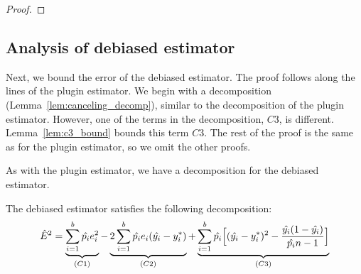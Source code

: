 \begin{proof}




\end{proof}

\subsection{Analysis of debiased estimator}

Next, we bound the error of the debiased estimator. The proof follows along the lines of the plugin estimator. We begin with a decomposition (Lemma~\ref{lem:canceling_decomp}), similar to the decomposition of the plugin estimator. However, one of the terms in the decomposition, $C3$, is different. Lemma~\ref{lem:c3_bound} bounds this term $C3$. The rest of the proof is the same as for the plugin estimator, so we omit the other proofs.

As with the plugin estimator, we have a decomposition for the debiased estimator.

\begin{lemma}
\label{lem:canceling_decomp}
The debiased estimator satisfies the following decomposition:
\[ \hat{E}^2{} = \underbrace{\sum_{i=1}^b \hat{p_i}e_i^2}_{(C1)}  - \underbrace{2\sum_{i=1}^b \hat{p_i}e_i(\hat{y_i} - y_i^*)}_{(C2)} + \underbrace{\sum_{i=1}^b \hat{p_i}\Big[ (\hat{y_i} - y_i^*)^2 - \frac{\hat{y_i}(1 - \hat{y_i})}{\hat{p_i}n-1} \Big]}_{(C3)} \]
\end{lemma}

